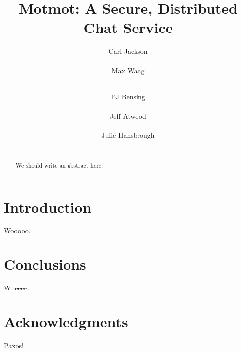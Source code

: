 \documentclass{sig-alternate}
\begin{document}

\title{Motmot: A Secure, Distributed Chat Service}

%
\author{
\alignauthor
Carl Jackson \\
   \\
%
\alignauthor
Max Wang \\
   \\
%
\and
\alignauthor
EJ Bensing \\
   \\
%
\alignauthor
Jeff Atwood \\
   \\
%
\alignauthor
Julie Hansbrough \\
   \\
}

\maketitle

\begin{abstract}

We should write an abstract here.

\end{abstract}

\section{Introduction}

Wooooo.

\section{Conclusions}

Wheeee.

\section{Acknowledgments}

\begin{thebibliography}{2}
    Paxos!

\end{thebibliography}
\end{document}
